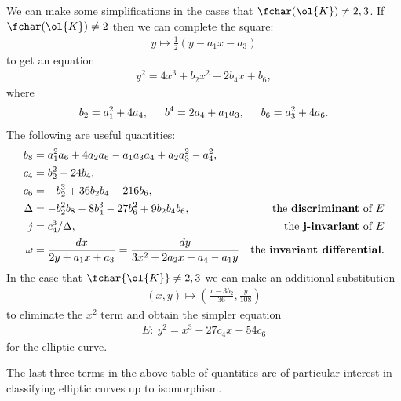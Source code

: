 We can make some simplifications in the cases that $\fchar(\ol{K}) \neq 2,3$. If $\fchar(\ol{K}) \neq 2$ then we can complete the square:
\begin{align*}
	y \mapsto \frac{1}{2}(y - a_1x - a_3)
\end{align*}
to get an equation
\begin{align*}
	y^2 = 4x^3 + b_2x^2 + 2b_4x + b_6,
\end{align*}
where
\begin{align*}
	b_2 = a_1^2 + 4a_4,\hspace{1.5em} b^4 = 2a_4+a_1a_3,\hspace{1.5em} b_6 = a_3^2+4a_6.
\end{align*}
The following are useful quantities:
\begin{align*}
	b_8 &= a_1^2a_6+4a_2a_6-a_1a_3a_4+a_2a_3^2-a_4^2, & \\
	c_4 &= b_2^2 - 24b_4, & \\
	c_6 &= -b_2^3+36b_2b_4 - 216b_6, & \\
	\Delta &= -b_2^2b_8-8b_4^3-27b_6^2+9b_2b_4b_6, & \text{the \textbf{discriminant} of $E$} \\
	j &= c_4^3/\Delta, &\text{the \textbf{j-invariant} of $E$} \\
	\omega &= \frac{dx}{2y+a_1x+a_3} = \frac{dy}{3x^2+2a_2x+a_4-a_1y} &\text{the \textbf{invariant differential}}.
\end{align*}
In the case that $\fchar{\ol{K}} \neq 2,3$ we can make an additional substitution
\begin{align*}
	(x,y) \mapsto \left(\frac{x - 3b_2}{36}, \frac{y}{108}\right)
\end{align*}
to eliminate the $x^2$ term and obtain the simpler equation
\begin{align*}
	E:~y^2 = x^3 - 27c_4x-54c_6
\end{align*}
for the elliptic curve.

The last three terms in the above table of quantities are of particular interest in classifying elliptic curves up to isomorphism.









